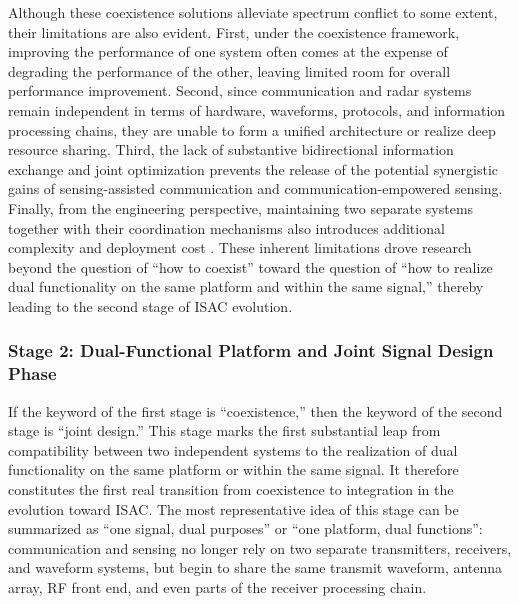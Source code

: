 Although these coexistence solutions alleviate spectrum conflict to some extent, their limitations are also evident. First, under the coexistence framework, improving the performance of one system often comes at the expense of degrading the performance of the other, leaving limited room for overall performance improvement. Second, since communication and radar systems remain independent in terms of hardware, waveforms, protocols, and information processing chains, they are unable to form a unified architecture or realize deep resource sharing. Third, the lack of substantive bidirectional information exchange and joint optimization prevents the release of the potential synergistic gains of sensing-assisted communication and communication-empowered sensing. Finally, from the engineering perspective, maintaining two separate systems together with their coordination mechanisms also introduces additional complexity and deployment cost \cite{Liu2020JointRadarComm,Liu2022ISAC}. These inherent limitations drove research beyond the question of ``how to coexist'' toward the question of ``how to realize dual functionality on the same platform and within the same signal,'' thereby leading to the second stage of ISAC evolution.

\subsubsection{Stage 2: Dual-Functional Platform and Joint Signal Design Phase}
\label{subsubsec:ch1-stage2}

If the keyword of the first stage is ``coexistence,'' then the keyword of the second stage is ``joint design.'' This stage marks the first substantial leap from compatibility between two independent systems to the realization of dual functionality on the same platform or within the same signal. It therefore constitutes the first real transition from coexistence to integration in the evolution toward ISAC. The most representative idea of this stage can be summarized as ``one signal, dual purposes'' or ``one platform, dual functions'': communication and sensing no longer rely on two separate transmitters, receivers, and waveform systems, but begin to share the same transmit waveform, antenna array, RF front end, and even parts of the receiver processing chain.

